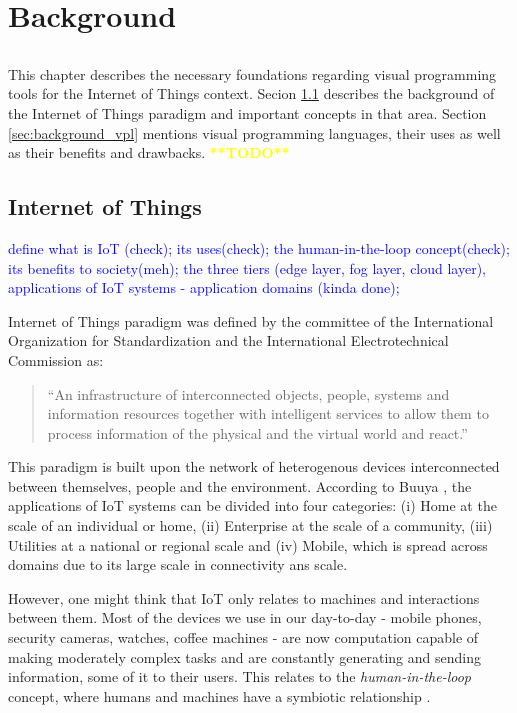 \chapter{Background} \label{chap:background}

\section*{}


This chapter describes the necessary foundations regarding visual programming tools for the Internet of Things context. Secion \ref{sec:background_iot} describes the background of the Internet of Things paradigm and important concepts in that area. Section \ref{sec:background_vpl} mentions visual programming languages, their uses as well as their benefits and drawbacks.  \textcolor{yellow}{\textbf{**TODO**}}

\section{Internet of Things}\label{sec:background_iot}


\textcolor{blue}{define what is IoT (check); its uses(check); the human-in-the-loop concept(check); its benefits to society(meh); the three tiers (edge layer, fog layer, cloud layer), applications of IoT systems - application domains (kinda done);}

Internet of Things paradigm was defined by the committee of the International Organization for Standardization and the International Electrotechnical Commission \cite{ISOIEC} as:
\begin{quote}
    “An infrastructure of interconnected objects, people, systems and information resources together with intelligent services to allow them to process information of the physical and the virtual world and react.”
\end{quote}
\par This paradigm is built upon the network of heterogenous devices interconnected between themselves, people and the environment. According to Buuya \cite{iot_future_direction}, the applications of IoT systems can be divided into four categories: (i) Home at the scale of an individual or home, (ii) Enterprise at the scale of a community, (iii) Utilities at a national or regional scale and (iv) Mobile, which is spread across domains due to its large scale in connectivity ans scale. 
\par However, one might think that IoT only relates to machines and interactions between them. Most of the devices we use in our day-to-day - mobile phones, security cameras, watches, coffee machines - are now computation capable of making moderately complex tasks and are constantly generating and sending information, some of it to their users. This relates to the \emph{human-in-the-loop} concept, where humans and machines have a symbiotic relationship \cite{human_in_the_loop_survey}.
 
